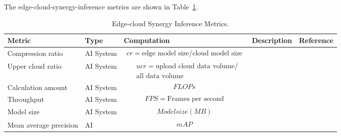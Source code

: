 The edge-cloud-synergy-inference metrics are shown in Table~\ref{tab:esi}.

\begin{table}[h!]
\caption{Edge-cloud Synergy Inference Metrics.} 
\label{tab:esi}
\begin{tabular}{|p{2cm}|l|p{6cm}|p{3cm}|p{1.5cm}|}

\hline
Metric                 & Type      & Computation & Description                                                                & Reference 
\\ \hline

Compression ratio
& AI System
& 
\parbox{3cm}{
    \begin{equation} \label{equ:cr}
    \begin{split}
cr =  \text{edge model size}  /  \text{cloud model size}
    \end{split} 
    \end{equation} 
}
& 
&      
\\ \hline

Upper cloud ratio
& AI System
& 
\parbox{3cm}{
    \begin{equation} \label{equ:ucr}
    \begin{split} 
& ucr = \text{upload cloud data volume} /  \\
& \text{all data volume} 
    \end{split} 
    \end{equation} 
}
& 
&      
\\ \hline

Calculation amount
& AI System
& 
\parbox{3cm}{
    \begin{equation} \label{equ:flops} 
    \begin{split}
FLOPs
    \end{split} 
    \end{equation} 
}
& 
&      
\\ \hline

Throughput
& AI System
& 
\parbox{3cm}{
    \begin{equation} \label{equ:fps} 
    \begin{split}
FPS =  \text{Frames per second} 
    \end{split} 
    \end{equation} 
}
& 
&      
\\ \hline

Model size
& AI System
& 
\parbox{3cm}{
    \begin{equation} \label{equ:mz} 
    \begin{split}
Model size (MB)
    \end{split} 
    \end{equation} 
}
& 
&      
\\ \hline

Mean average precision
& AI 
& 
\parbox{3cm}{
    \begin{equation} \label{equ:map} 
    \begin{split}
mAP
    \end{split} 
    \end{equation} 
}
& 
&      
\\ \hline
\end{tabular}
\end{table} 


